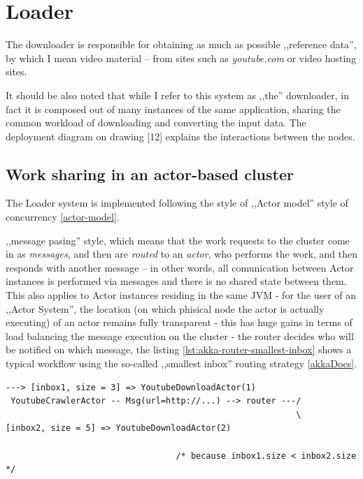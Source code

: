 \section{Loader}
The downloader is responsible for obtaining as much as possible ,,reference data'', by which I mean video material -- from sites such as \textit{youtube.com} or video hosting sites.

It should be also noted that while I refer to this system as ,,the'' downloader, in fact it is composed out of many instances of the same application, sharing the common workload of downloading and converting the input data. The deployment diagram on drawing [12] explains the interactions between the nodes.

\subsection{Work sharing in an actor-based cluster}
The Loader system is implemented following the style of ,,Actor model'' style of concurrency \ref{actor-model}.

 ,,message pasing'' style, which means that the work requests to the cluster come in as \textit{messages}, and then are \textit{routed} to an \textit{actor}, who performs the work, and then responds with another message -- in other words, all comunication between Actor instances is performed via messages and there is no shared state between them. 
This also applies to Actor instances residing in the same JVM - for the user of an ,,Actor System'', the location (on which phisical node the actor is actually executing) of an actor remains fully transparent - this has huge gains in terms of load balancing the message execution on the cluster - the router decides who will be notified on which message, the listing \ref{lst:akka-router-smallest-inbox} shows a typical workflow using the so-called ,,smallest inbox'' routing strategy \ref{akkaDocs}.

\begin{lstlisting}[caption={smallest-inbox routing algorithm},label={lst:akka-router-smallest-inbox}]
                                                           ---> [inbox1, size = 3] => YoutubeDownloadActor(1)
 YoutubeCrawlerActor -- Msg(url=http://...) --> router ---/
                                                          \     [inbox2, size = 5] => YoutubeDownloadActor(2)
                                                                   
                                  /* because inbox1.size < inbox2.size */ 
\end{lstlisting}

